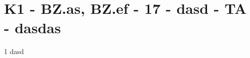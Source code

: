 \section{K1 - BZ.as, BZ.ef - 17 - dasd - TA - dasdas}

\begin{langesbeispiel} \item[1] %
dasd
\end{langesbeispiel}